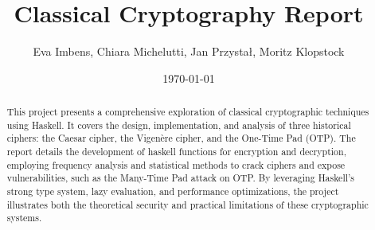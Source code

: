 \documentclass[12pt,a4paper]{article}
\title{Classical Cryptography Report}
\author{Eva Imbens, Chiara Michelutti, Jan Przystał, Moritz Klopstock}
\date{\today}
\begin{document}
\maketitle

\begin{abstract}
    This project presents a comprehensive exploration of classical cryptographic techniques using Haskell. It covers the design, implementation, and analysis of three historical ciphers: the Caesar cipher, the Vigenère cipher, and the One-Time Pad (OTP). The report details the development of haskell functions for encryption and decryption, employing frequency analysis and statistical methods to crack ciphers and expose vulnerabilities, such as the Many-Time Pad attack on OTP. By leveraging Haskell’s strong type system, lazy evaluation, and performance optimizations, the project illustrates both the theoretical security and practical limitations of these cryptographic systems.
\end{abstract}

\vfill

\tableofcontents

\clearpage
























\newpage



\end{document}
